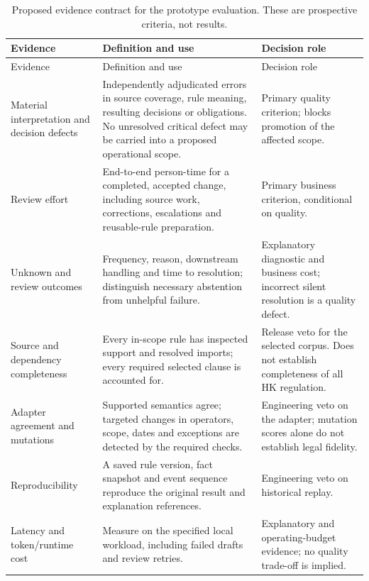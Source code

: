 \documentclass[12pt,a4paper,oneside,openany]{book}
\begin{document}
\begingroup\small
\begin{longtable}{P{0.25\textwidth}P{0.39\textwidth}P{0.26\textwidth}}
\caption{Proposed evidence contract for the prototype evaluation. These are
prospective criteria, not results.}\label{tab:evaluation}\\
\toprule Evidence & Definition and use & Decision role \\\midrule
\endfirsthead
\toprule Evidence & Definition and use & Decision role \\\midrule
\endhead
Material interpretation and decision defects & Independently adjudicated errors
in source coverage, rule meaning, resulting decisions or obligations. No unresolved
critical defect may be carried into a proposed operational scope. & Primary quality
criterion; blocks promotion of the affected scope.\\
Review effort & End-to-end person-time for a completed, accepted change, including
source work, corrections, escalations and reusable-rule preparation. & Primary
business criterion, conditional on quality.\\
Unknown and review outcomes & Frequency, reason, downstream handling and time to
resolution; distinguish necessary abstention from unhelpful failure. & Explanatory
diagnostic and business cost; incorrect silent resolution is a quality defect.\\
Source and dependency completeness & Every in-scope rule has inspected support and
resolved imports; every required selected clause is accounted for. & Release veto
for the selected corpus. Does not establish completeness of all HK regulation.\\
Adapter agreement and mutations & Supported semantics agree; targeted changes in
operators, scope, dates and exceptions are detected by the required checks. &
Engineering veto on the adapter; mutation scores alone do not establish legal fidelity.\\
Reproducibility & A saved rule version, fact snapshot and event sequence reproduce
the original result and explanation references. & Engineering veto on historical replay.\\
Latency and token/runtime cost & Measure on the specified local workload, including
failed drafts and review retries. & Explanatory and operating-budget evidence; no
quality trade-off is implied.\\
\bottomrule
\end{longtable}
\endgroup
\end{document}
